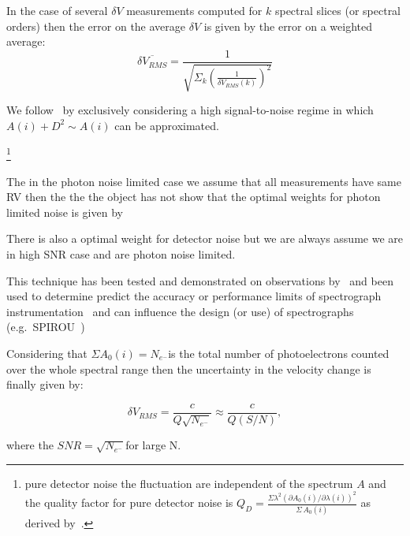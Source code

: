 In the case of several \(\delta V\) measurements computed for \(k\) spectral slices (or spectral orders) then the error on the average \(\delta V\) is given by the error on a weighted average:
\begin{equation}
\overline{\delta {V}_{RMS}} = \frac{1}{\sqrt{\Sigma_k{(\frac{1}{\delta V_{RMS}(k)})^2}}}
\end{equation}


We follow~\cite{figueira_radial_2016} by exclusively considering a high signal-to-noise regime in which \(A(i) + D^2 \sim A(i)\) can be approximated.


\footnote{pure detector noise the fluctuation are independent of the spectrum \(A\) and the quality factor for pure detector noise is \(Q_D = \frac{\Sigma{\lambda^2 {(\partial A_0(i)/\partial \lambda(i))}^{2}}}{\Sigma{\, A_0(i)}}\) as derived by~\cite{connes_absolute_1985}. }

The in the photon noise limited case we assume that all measurements have same RV then the the the object has not
\citet{connes_absolute_1985} show that the optimal weights for photon limited noise is given by 

There is also a optimal weight for detector noise but we are always assume we are in high SNR case and are photon noise limited.


This technique has been tested and demonstrated on observations by~\citet{connes_demonstration_1996} and been used to determine predict the accuracy or performance limits of spectrograph instrumentation~\citet{connes_absolute_1985,bouchy_fundamental_2001} and can influence the design (or use) of spectrographs
 (e.g.\ SPIROU~\citep{artigau_spirou_2014,figueira_radial_2016})


Considering that \(\Sigma{A_0(i)} = N_{e^-}\)is the total number of photoelectrons counted over the whole spectral range then the uncertainty in the velocity change is finally given by:

\begin{equation}
\delta V_{RMS} = \frac{c}{Q \sqrt{N_{e^-}}} \approx \frac{c}{Q (S/N)}, \label{eq:rv_SNR}
\end{equation}

where the \(SNR=\sqrt{N_{e^-}}\)for large N. 




